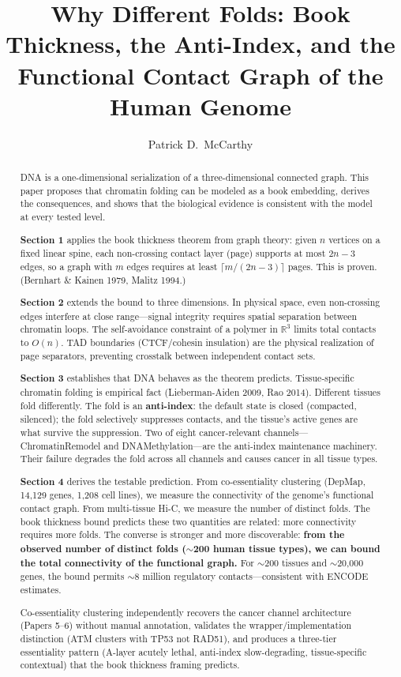 \documentclass[11pt]{article}
\title{Why Different Folds: Book Thickness, the Anti-Index, and the Functional Contact Graph of the Human Genome}
\author{Patrick D.\ McCarthy}
\date{}
\theoremstyle{definition}
\begin{document}
\maketitle

\begin{abstract}
DNA is a one-dimensional serialization of a three-dimensional connected graph. This paper proposes that chromatin folding can be modeled as a book embedding, derives the consequences, and shows that the biological evidence is consistent with the model at every tested level.

\textbf{Section 1} applies the book thickness theorem from graph theory: given $n$ vertices on a fixed linear spine, each non-crossing contact layer (page) supports at most $2n - 3$ edges, so a graph with $m$ edges requires at least $\lceil m/(2n - 3) \rceil$ pages. This is proven. (Bernhart \& Kainen 1979, Malitz 1994.)

\textbf{Section 2} extends the bound to three dimensions. In physical space, even non-crossing edges interfere at close range---signal integrity requires spatial separation between chromatin loops. The self-avoidance constraint of a polymer in $\mathbb{R}^3$ limits total contacts to $O(n)$. TAD boundaries (CTCF/cohesin insulation) are the physical realization of page separators, preventing crosstalk between independent contact sets.

\textbf{Section 3} establishes that DNA behaves as the theorem predicts. Tissue-specific chromatin folding is empirical fact (Lieberman-Aiden 2009, Rao 2014). Different tissues fold differently. The fold is an \textbf{anti-index}: the default state is closed (compacted, silenced); the fold selectively suppresses contacts, and the tissue's active genes are what survive the suppression. Two of eight cancer-relevant channels---ChromatinRemodel and DNAMethylation---are the anti-index maintenance machinery. Their failure degrades the fold across all channels and causes cancer in all tissue types.

\textbf{Section 4} derives the testable prediction. From co-essentiality clustering (DepMap, 14,129 genes, 1,208 cell lines), we measure the connectivity of the genome's functional contact graph. From multi-tissue Hi-C, we measure the number of distinct folds. The book thickness bound predicts these two quantities are related: more connectivity requires more folds. The converse is stronger and more discoverable: \textbf{from the observed number of distinct folds ($\sim$200 human tissue types), we can bound the total connectivity of the functional graph.} For $\sim$200 tissues and $\sim$20,000 genes, the bound permits $\sim$8 million regulatory contacts---consistent with ENCODE estimates.

Co-essentiality clustering independently recovers the cancer channel architecture (Papers 5--6) without manual annotation, validates the wrapper/implementation distinction (ATM clusters with TP53 not RAD51), and produces a three-tier essentiality pattern (A-layer acutely lethal, anti-index slow-degrading, tissue-specific contextual) that the book thickness framing predicts.
\end{abstract}
\end{document}
